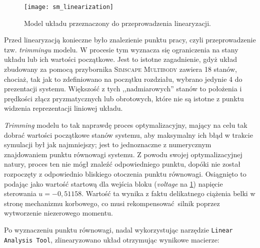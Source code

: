 \begin{figure}[h]
    \centering
    \texttt{[image: sm\_linearization]}
    \caption{Model układu przeznaczony do przeprowadzenia linearyzacji.}
    \label{fig:sm_linearization}
\end{figure}

Przed linearyzacją konieczne było znalezienie punktu pracy, czyli przeprowadzenie tzw. \textit{trimmingu} modelu. W procesie tym wyznacza się ograniczenia na stany układu lub ich wartości początkowe. Jest to istotne zagadnienie, gdyż układ zbudowany za pomocą przybornika \textsc{Simscape Multibody} zawiera \num{18} stanów, chociaż, tak jak to zdefiniowano na początku rozdziału, wybrano jedynie \num{4} do prezentacji systemu. Większość z tych ,,nadmiarowych'' stanów to położenia i prędkości złącz pryzmatycznych lub obrotowych, które nie są istotne z punktu widzenia reprezentacji liniowej układu.

\textit{Trimming} modelu to tak naprawdę proces optymalizacyjny, mający na celu tak dobrać wartości początkowe stanów systemu, aby maksymalny ich błąd w trakcie symulacji był jak najmniejszy; jest to jednoznaczne z numerycznym znajdowaniem punktu równowagi systemu. Z powodu swojej optymalizacyjnej natury, proces ten nie mógł znaleźć odpowiedniego punktu, dopóki nie został rozpoczęty z odpowiednio bliskiego otoczenia punktu równowagi. Osiągnięto to podając jako wartość startową dla wejścia bloku (\textit{voltage} na \cref{fig:sm_linearization}) napięcie sterowania $u = -0,51158$. Wartość ta wynika z faktu delikatnego ciążenia belki w stronę mechanizmu korbowego, co musi rekompensować silnik poprzez wytworzenie niezerowego momentu.

Po wyznaczeniu punktu równowagi, nadal wykorzystując narzędzie \texttt{Linear Analysis Tool}, zlinearyzowano układ otrzymując wynikowe macierze:

